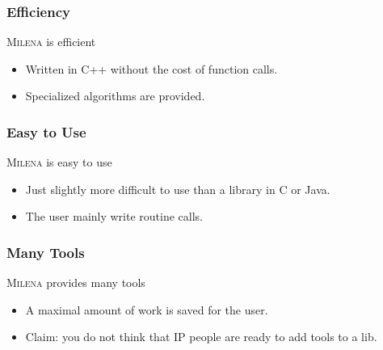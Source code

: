 \documentclass{beamer}
\newcommand{\mln}{\textsc{Milena}\xspace}
\begin{document}
\begin{frame}
  \frametitle{Efficiency}

  \begin{block}{\mln is efficient}
    \begin{itemize}
    \item Written in C++ without the cost of function calls.
    \item Specialized algorithms are provided.
    \end{itemize}
  \end{block}


\end{frame}


\begin{frame}
  \frametitle{Easy to Use}

  \begin{block}{\mln is easy to use}
    \begin{itemize}
    \item Just slightly more difficult to use than a library in C or Java.
    \item The user mainly write routine calls.
    \end{itemize}
  \end{block}


\end{frame}


\begin{frame}
  \frametitle{Many Tools}

  \begin{block}{\mln provides many tools}
    \begin{itemize}
    \item A maximal amount of work is saved for the user.
    \item Claim: you do not think that IP people are ready to add tools to a lib.
    \end{itemize}
  \end{block}


\end{frame}




\end{document}

